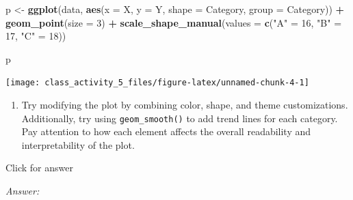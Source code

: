 \documentclass[
]{book}
\newenvironment{Shaded}{\begin{snugshade}}{\end{snugshade}}
\newcommand{\AttributeTok}[1]{\textcolor[rgb]{0.13,0.29,0.53}{#1}}
\newcommand{\DecValTok}[1]{\textcolor[rgb]{0.00,0.00,0.81}{#1}}
\newcommand{\FunctionTok}[1]{\textcolor[rgb]{0.13,0.29,0.53}{\textbf{#1}}}
\newcommand{\NormalTok}[1]{#1}
\newcommand{\OtherTok}[1]{\textcolor[rgb]{0.56,0.35,0.01}{#1}}
\newcommand{\SpecialCharTok}[1]{\textcolor[rgb]{0.81,0.36,0.00}{\textbf{#1}}}
\newcommand{\StringTok}[1]{\textcolor[rgb]{0.31,0.60,0.02}{#1}}
\providecommand{\tightlist}{%
  \setlength{\itemsep}{0pt}\setlength{\parskip}{0pt}}
\begin{document}
\begin{Shaded}
\begin{Highlighting}[]
\NormalTok{p }\OtherTok{\textless{}{-}} \FunctionTok{ggplot}\NormalTok{(data, }\FunctionTok{aes}\NormalTok{(}\AttributeTok{x =}\NormalTok{ X, }\AttributeTok{y =}\NormalTok{ Y, }\AttributeTok{shape =}\NormalTok{ Category,  }\AttributeTok{group =}\NormalTok{ Category)) }\SpecialCharTok{+}
  \FunctionTok{geom\_point}\NormalTok{(}\AttributeTok{size =} \DecValTok{3}\NormalTok{) }\SpecialCharTok{+}
  \FunctionTok{scale\_shape\_manual}\NormalTok{(}\AttributeTok{values =} \FunctionTok{c}\NormalTok{(}\StringTok{"A"} \OtherTok{=} \DecValTok{16}\NormalTok{, }\StringTok{"B"} \OtherTok{=} \DecValTok{17}\NormalTok{, }\StringTok{"C"} \OtherTok{=} \DecValTok{18}\NormalTok{))}

\NormalTok{p}
\end{Highlighting}
\end{Shaded}

\texttt{[image: class\_activity\_5\_files/figure-latex/unnamed-chunk-4-1]}

\begin{enumerate}
\def\labelenumi{\alph{enumi}.}
\setcounter{enumi}{2}
\tightlist
\item
  Try modifying the plot by combining color, shape, and theme customizations. Additionally, try using \texttt{geom\_smooth()} to add trend lines for each category. Pay attention to how each element affects the overall readability and interpretability of the plot.
\end{enumerate}

Click for answer

\emph{Answer:}
\end{document}
